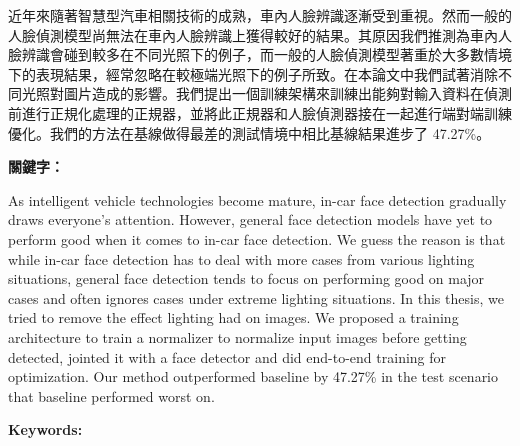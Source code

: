 \begin{abstractzh}
近年來隨著智慧型汽車相關技術的成熟，車內人臉辨識逐漸受到重視。然而一般的人臉偵測模型尚無法在車內人臉辨識上獲得較好的結果。其原因我們推測為車內人臉辨識會碰到較多在不同光照下的例子，而一般的人臉偵測模型著重於大多數情境下的表現結果，經常忽略在較極端光照下的例子所致。在本論文中我們試著消除不同光照對圖片造成的影響。我們提出一個訓練架構來訓練出能夠對輸入資料在偵測前進行正規化處理的正規器，並將此正規器和人臉偵測器接在一起進行端對端訓練優化。我們的方法在基線做得最差的測試情境中相比基線結果進步了 47.27\%。

\bigbreak
\noindent \textbf{關鍵字：}{\, \makeatletter \@keywordszh \makeatother}
\end{abstractzh}

\begin{abstracten}
As intelligent vehicle technologies become mature, in-car face detection gradually draws everyone's attention. However, general face detection models have yet to perform good when it comes to in-car face detection. We guess the reason is that while in-car face detection has to deal with more cases from various lighting situations, general face detection tends to focus on performing good on major cases and often ignores cases under extreme lighting situations. In this thesis, we tried to remove the effect lighting had on images. We proposed a training architecture to train a normalizer to normalize input images before getting detected, jointed it with a face detector and did end-to-end training for optimization. Our method outperformed baseline by 47.27\% in the test scenario that baseline performed worst on.

\bigbreak
\noindent \textbf{Keywords:}{\, \makeatletter \@keywordsen \makeatother}
\end{abstracten}
